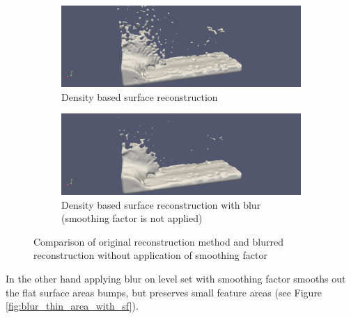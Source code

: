 \begin{figure}[H]
	\begin{center}
		\begin{subfigure}[b]{\textwidth}
			\includegraphics[width=\textwidth]{figures/DenvityBlurredSplashArea.png}
			\caption{Density based surface reconstruction}
			\label{fig:denc_rec}
		\end{subfigure}
		\begin{subfigure}[b]{\textwidth}
			\includegraphics[width=\textwidth]{figures/DenvityBasedSplashArea.png}
			\caption{Density based surface reconstruction with blur (smoothing factor is not applied)}
			\label{fig:blur_w_o_sf}
		\end{subfigure}
	\end{center}
	\caption{Comparison of original reconstruction method and blurred reconstruction without application of smoothing factor}
	\label{fig:blur_thin_area}
\end{figure}
In the other hand applying blur on level set with smoothing factor smooths out the flat surface areas bumps, but preserves small feature areas (see Figure \ref{fig:blur_thin_area_with_sf}).
